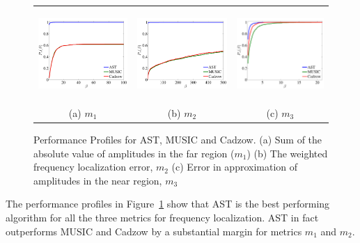 \begin{figure}[htp]
\begin{tabular}{ccc}
	\includegraphics[height=35mm]{figures/m1_pp.pdf} &
	\includegraphics[height=35mm]{figures/m2_pp.pdf} &
	\includegraphics[height=35mm]{figures/m3_pp.pdf}\\
	(a) $m_1$ & (b) $m_2$ & (c) $m_3$
\end{tabular}
\caption{ Performance Profiles for AST, MUSIC and Cadzow.
(a) Sum of the absolute value of amplitudes in the far region ($m_1$)
(b) The weighted frequency localization error, $m_2$
(c) Error in approximation of amplitudes in the near region, $m_3$ }
\label{fig:pp2}
\end{figure}

The performance profiles in Figure~\ref{fig:pp2} show that AST is the best
performing algorithm for all the three metrics for frequency localization. AST
in fact outperforms MUSIC and Cadzow by a substantial margin for metrics $m_1$
and $m_2$.


